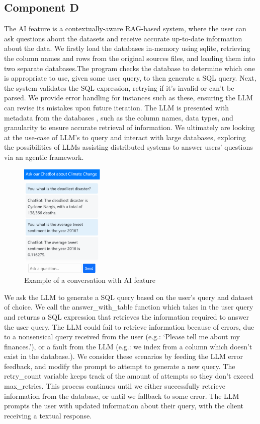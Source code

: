 \documentclass[pdflatex,sn-mathphys-num]{sn-jnl}%
\theoremstyle{thmstyleone}%
\theoremstyle{thmstyletwo}%
\theoremstyle{thmstylethree}%
\begin{document}
\newpage

\subsection{Component D}\label{subsec10}
The AI feature is a contextually-aware RAG-based system, where the user can ask questions about the datasets and receive accurate up-to-date information about the data. We firstly load the databases in-memory using sqlite, retrieving the column names and rows from the original sources files, and loading them into two separate databases.The program checks the database to determine which one is appropriate to use, given some user query, to then generate a SQL query. Next, the system validates the SQL expression, retrying if it's invalid or can’t be parsed. We provide error handling for instances such as these, ensuring the LLM can revise its mistakes upon future iteration. The LLM is presented with metadata from the databases , such as the column names, data types, and granularity to ensure accurate retrieval of information. We ultimately are looking at the use-case of LLM’s to query and interact with large databases, exploring the possibilities of LLMs assisting distributed systems to answer users' questions via an agentic framework.

\begin{figure}[H]
\centering
\includegraphics[width=4cm]{images/climatechangepulse6.PNG}
\caption{Example of a conversation with AI feature}
\end{figure}

We ask the LLM to generate a SQL query based on the user’s query and dataset of choice. We call the answer\_with\_table function which takes in the user query and returns a SQL expression that retrieves the information required to answer the user query. The LLM could fail to retrieve information because of errors, due to a nonsensical query received from the user (e.g.: ‘Please tell me about my finances.’), or a fault from the LLM (e.g.: we index from a column which doesn’t exist in the database.). We consider these scenarios by feeding the LLM error feedback, and modify the prompt to attempt to generate a new query. The retry\_count variable keeps track of the amount of attempts so they don’t exceed max\_retries. This process continues until we either successfully retrieve information from the database, or until we fallback to some error. The LLM prompts the user with updated information about their query, with the client receiving a textual response.
\newpage
\end{document}
